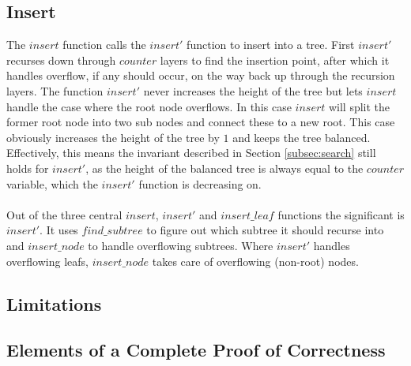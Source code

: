 \subsection{Insert}
The $insert$ function calls the $insert'$ function to insert into a tree. First $insert'$ recurses down through $counter$ layers to find the insertion point, after which it handles overflow, if any should occur, on the way back up through the recursion layers. The function $insert'$ never increases the height of the tree but lets $insert$ handle the case where the root node overflows. In this case $insert$ will split the former root node into two sub nodes and connect these to a new root. This case obviously increases the height of the tree by $1$ and keeps the tree balanced. Effectively, this means the invariant described in Section \ref{subsec:search} still holds for $insert'$, as the height of the balanced tree is always equal to the $counter$ variable, which the $insert'$ function is decreasing on.
\paragraph{}
Out of the three central $insert$, $insert'$ and $insert\_leaf$ functions the significant is $insert'$. It uses $find\_subtree$ to figure out which subtree it should recurse into and $insert\_node$ to handle overflowing subtrees. Where $insert'$ handles overflowing leafs, $insert\_node$ takes care of overflowing (non-root) nodes.


\paragraph{}
\subsection{Limitations}

\subsection{Elements of a Complete Proof of Correctness}
